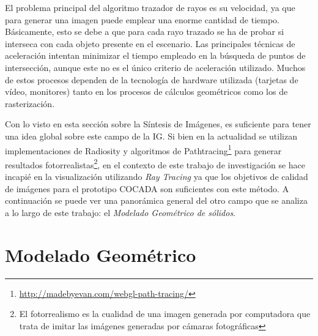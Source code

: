 

El problema principal del algoritmo trazador de rayos es su velocidad, ya que para generar una imagen puede emplear una enorme cantidad de tiempo. Básicamente, esto se debe a que para cada rayo trazado se ha de probar si interseca con cada objeto presente en el escenario. Las principales técnicas de aceleración intentan minimizar el tiempo empleado en la búsqueda de puntos de intersección, aunque este no es el único criterio de aceleración utilizado. Muchos de estos procesos dependen de la tecnología de hardware utilizada (tarjetas de vídeo, monitores) tanto en los procesos de cálculos geométricos como los de rasterización.
 

Con lo visto en esta sección sobre la Síntesis de Imágenes, es suficiente para tener una idea global sobre este campo de la IG. Si bien en la actualidad se utilizan implementaciones de Radiosity y algoritmos de Pathtracing\footnote{\url{http://madebyevan.com/webgl-path-tracing/}} para generar resultados fotorrealistas\footnote{El fotorrealismo es la cualidad de una imagen generada por computadora que trata de imitar las imágenes generadas por cámaras fotográficas}, en el contexto de este trabajo de investigación se hace incapié en la visualización utilizando \textit{Ray Tracing} ya que los objetivos de calidad de imágenes para el prototipo COCADA son suficientes con este método. A continuación se puede ver una panorámica general del otro campo que se analiza a lo largo de este trabajo: el \textit{Modelado Geométrico de sólidos}.


\clearpage
\section{Modelado Geométrico}


